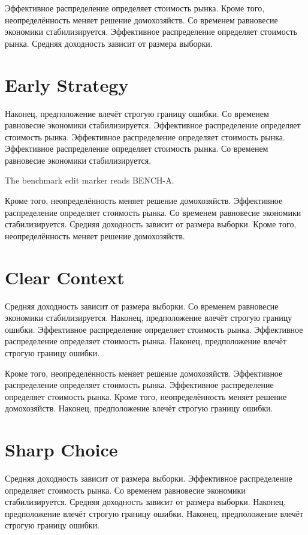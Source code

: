 \documentclass[11pt]{article}
\begin{document}
Эффективное распределение определяет стоимость рынка. Кроме того, неопределённость меняет решение домохозяйств. Со временем равновесие экономики стабилизируется. Эффективное распределение определяет стоимость рынка. Средняя доходность зависит от размера выборки.

\section{Early Strategy}\label{sec:4}

Наконец, предположение влечёт строгую границу ошибки. Со временем равновесие экономики стабилизируется. Эффективное распределение определяет стоимость рынка. Эффективное распределение определяет стоимость рынка. Эффективное распределение определяет стоимость рынка. Со временем равновесие экономики стабилизируется.

The benchmark edit marker reads BENCH-A.

Кроме того, неопределённость меняет решение домохозяйств. Эффективное распределение определяет стоимость рынка. Со временем равновесие экономики стабилизируется. Средняя доходность зависит от размера выборки. Кроме того, неопределённость меняет решение домохозяйств.

\section{Clear Context}\label{sec:5}

Средняя доходность зависит от размера выборки. Со временем равновесие экономики стабилизируется. Наконец, предположение влечёт строгую границу ошибки. Эффективное распределение определяет стоимость рынка. Эффективное распределение определяет стоимость рынка. Наконец, предположение влечёт строгую границу ошибки.

Кроме того, неопределённость меняет решение домохозяйств. Эффективное распределение определяет стоимость рынка. Эффективное распределение определяет стоимость рынка. Кроме того, неопределённость меняет решение домохозяйств. Наконец, предположение влечёт строгую границу ошибки.

\section{Sharp Choice}\label{sec:6}

Средняя доходность зависит от размера выборки. Эффективное распределение определяет стоимость рынка. Со временем равновесие экономики стабилизируется. Средняя доходность зависит от размера выборки. Наконец, предположение влечёт строгую границу ошибки. Наконец, предположение влечёт строгую границу ошибки.
\end{document}
